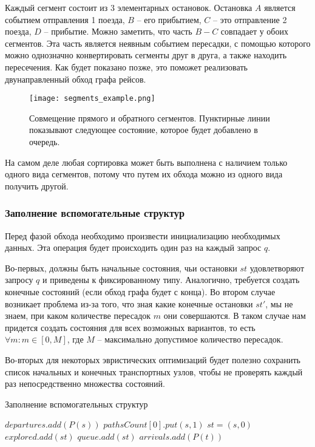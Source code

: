 Каждый сегмент состоит из 3 элементарных остановок. Остановка $A$ является событием отправления 1 поезда, $B$ -- его прибытием, $C$ -- это отправление 2 поезда, $D$ -- прибытие. Можно заметить, что часть $B-C$ совпадает у обоих сегментов. Эта часть является неявным событием пересадки, с помощью которого можно однозначно конвертировать сегменты друг в друга, а также находить пересечения. Как будет показано позже, это поможет реализовать двунаправленный обход графа рейсов.

\begin{figure}[!h]
	\centering
	\texttt{[image: segments\_example.png]}
	\caption{Совмещение прямого и обратного сегментов. Пунктирные линии показывают следующее состояние, которое будет добавлено в очередь.}\label{fig4}
\end{figure}

На самом деле любая сортировка может быть выполнена с наличием только одного вида сегментов, потому что путем их обхода можно из одного вида получить другой.

\subsubsection{Заполнение вспомогательные структур}
Перед фазой обхода необходимо произвести инициализацию необходимых данных. Эта операция будет происходить один раз на каждый запрос $q$.

Во-первых, должны быть начальные состояния, чьи остановки $st$ удовлетворяют запросу $q$ и приведены к фиксированному типу. Аналогично, требуется создать конечные состояний (если обход графа будет с конца). Во втором случае возникает проблема из-за того, что зная какие конечные остановки $st'$, мы не знаем, при каком количестве пересадок $m$ они совершаются. В таком случае нам придется создать состояния для всех возможных вариантов, то есть $\forall m : m \in [0, M]$, где $M$ -- максимально допустимое количество пересадок. 

Во-вторых для некоторых эвристических оптимизаций будет полезно сохранить список начальных и конечных транспортных узлов, чтобы не проверять каждый раз непосредственно множества состояний.

\begin{algorithm}[!h]
	\caption{Заполнение вспомогательных структур}\label{lst5}
	\begin{algorithmic}
			\State $departures.add(P(s))$ 
			\State $pathsCount[0].put(s, 1)$ 
			\State $st = (s, 0)$ 
			\State $explored.add(st)$ 
			\State $queue.add(st)$ 
		\EndFor
			\State $arrivals.add(P(t))$ 
		\EndFor
	\end{algorithmic}
\end{algorithm}

